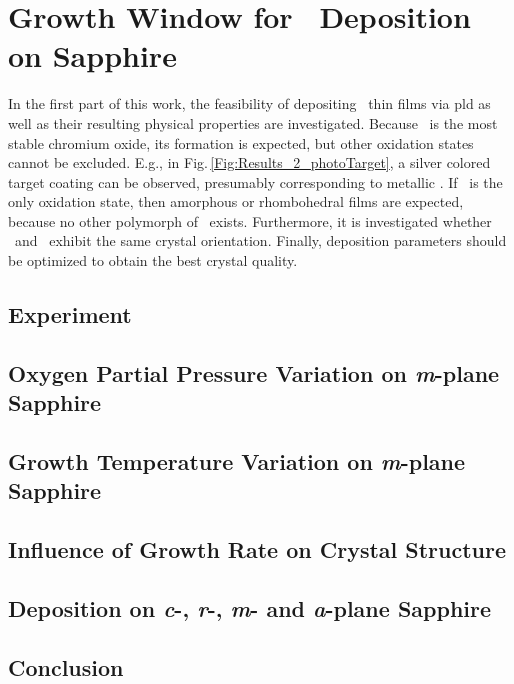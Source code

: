 \section{Growth Window for \texorpdfstring{\cro}{Cr2O3}\ Deposition on Sapphire}
    \label{Sec:Results_Preliminary}
In the first part of this work, the feasibility of depositing \cro\ thin films via \gls{pld} as well as their resulting physical properties are investigated.
Because \cro\ is the most stable chromium oxide, its formation is expected, but other oxidation states cannot be excluded.
E.g., in Fig.\,\ref{Fig:Results_2_photoTarget}, a silver colored target coating can be observed, presumably corresponding to metallic .
If \cro\ is the only oxidation state, then amorphous or rhombohedral films are expected, because no other polymorph of \cro\ exists.
Furthermore, it is investigated whether \alo\ and \cro\ exhibit the same crystal orientation.
Finally, deposition parameters should be optimized to obtain the best crystal quality.

\subsection{Experiment}
    

    \subsection{Oxygen Partial Pressure Variation on \textit{m}-plane Sapphire}
        
    \subsection{Growth Temperature Variation on \textit{m}-plane Sapphire}
        
    \subsection{Influence of Growth Rate on Crystal Structure}
        
    \subsection{Deposition on \textit{c}-, \textit{r}-, \textit{m}- and \textit{a}-plane Sapphire}
        

\subsection{Conclusion}
    